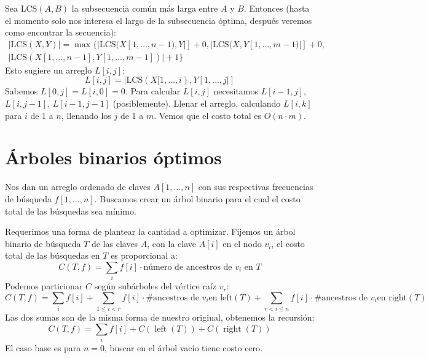   Sea \(\mathrm{LCS}(A, B)\)
  la subsecuencia común más larga entre \(A\) y \(B\).
  Entonces
  (hasta el momento solo nos interesa el largo de la subsecuencia óptima,
   después veremos como encontrar la secuencia):
  \begin{align*}
    \lvert \mathrm{LCS}(X, Y) \rvert
      = \max\{\lvert \mathrm{LCS}(X[1, \dotsc, n - 1), Y \rvert] + 0,
	      \lvert \mathrm{LCS}(X, Y[1, \dotsc, m - 1) \rvert] + 0, \\
	      \lvert \mathrm{LCS}(X[1, \dotsc, n - 1],
					Y[1, \dotsc, m - 1]) \rvert
			  + 1 \}
  \end{align*}
  Esto sugiere un arreglo \(L[i, j]\):
  \begin{equation}
    L[i, j]
      = \lvert \mathrm{LCS}(X[1, \ldots, i), Y[1, \ldots, j \rvert]
  \end{equation}
  Sabemos \(L[0, j] = L[i, 0] = 0\).
  Para calcular \(L[i, j]\)
  necesitamos \(L[i-1, j]\), \(L[i, j-1]\), \(L[i-1, j-1]\) (posiblemente).
  Llenar el arreglo,
  calculando \(L[i, k]\) para \(i\) de \num{1} a \(n\),
  llenando los \(j\) de \num{1} a \(m\).
  Vemos que el costo total es \(O(n\cdot m)\).

\section{Árboles binarios óptimos}
\label{sec:optimal-BST}

  Nos dan un arreglo ordenado de claves \(A[1, \dotsc, n]\)
  con sus respectivas frecuencias de búsqueda \(f[1, \dotsc, n]\).
  Buscamos crear un árbol binario
  para el cual el costo total de las búsquedas sea mínimo.

  Requerimos una forma de plantear la cantidad a optimizar.
  Fijemos un árbol binario de búsqueda \(T\) de las claves \(A\),
  con la clave \(A[i]\) en el nodo \(v_i\),
  el costo total de las búsquedas en \(T\) es proporcional a:
  \begin{equation*}
    C(T, f)
      = \sum_i f[i] \cdot \text{número de ancestros de \(v_i\) en \(T\)}
  \end{equation*}
  Podemos particionar \(C\) según subárboles del vértice raíz \(v_r\):
  \begin{equation*}
    C(T, f)
      = \sum_i f[i]
	  + \sum_{1 \le i < r}
	      f[i] \cdot \text{\# ancestros de \(v_i\)
		 en \(\mathrm{left}(T)\)}
	  + \sum_{r < i \le n}
	      f[i] \cdot \text{\# ancestros de \(v_i\)
		 en \(\mathrm{right}(T)\)}
  \end{equation*}
  Las dos sumas son de la misma forma de nuestro original,
  obtenemos la recursión:
  \begin{equation*}
    C(T, f)
      = \sum_i f[i] + C(\operatorname{left}(T)) + C(\operatorname{right}(T))
  \end{equation*}
  El caso base es para \(n = 0\),
  buscar en el árbol vacío tiene costo cero.

